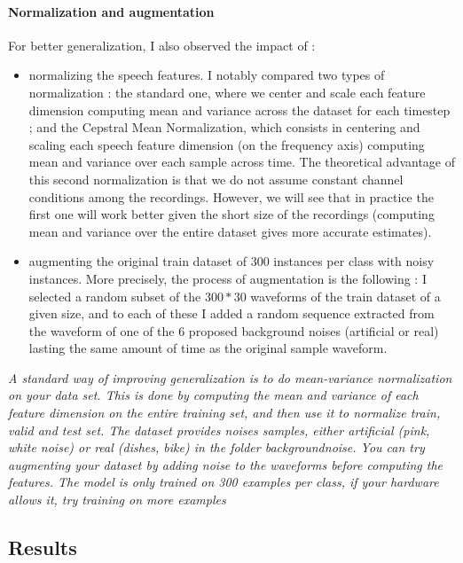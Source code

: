 \documentclass[11pt]{article}
\begin{document}
\paragraph{Normalization and augmentation}

For better generalization, I also observed the impact of :
\begin{itemize}
\item normalizing the speech features. I notably compared two types of normalization : the standard one, where we center and scale each feature dimension computing mean and variance across the dataset for each timestep ; and the Cepstral Mean Normalization, which consists in centering and scaling each speech feature dimension (on the frequency axis) computing mean and variance over each sample across time.  The theoretical advantage of this second normalization is that we do not assume constant channel conditions among the recordings. However, we will see that in practice the first one will work better given the short size of the recordings (computing mean and variance over the entire dataset gives more accurate estimates).
\item augmenting the original train dataset of 300 instances per class with noisy instances. More precisely, the process of augmentation is the following : I selected a random subset of the $300*30$ waveforms of the train dataset of a given size, and to each of these I added a random sequence extracted from the waveform of one of the $6$ proposed background noises (artificial or real) lasting the same amount of time as the original sample waveform.
\end{itemize}

\textit{A standard way of improving generalization is to do mean-variance normalization on your data set. This is done by computing the mean and variance of each feature dimension on the entire training set, and then use it to normalize train, valid and test set. The dataset provides noises samples, either artificial (pink, white noise) or real (dishes, bike) in the folder backgroundnoise. You can try augmenting your dataset by adding noise to the waveforms before computing the features. The model is only trained on 300 examples per class, if your hardware allows it, try training on more examples}

\subsection{Results}
\end{document}

